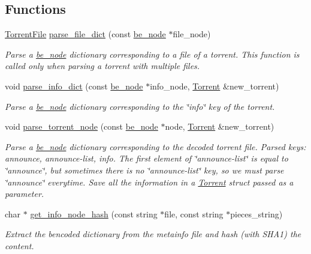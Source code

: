 \subsection*{Functions}
\begin{DoxyCompactItemize}
\item 
\hyperlink{structtorr_1_1TorrentFile}{Torrent\+File} \hyperlink{namespacetorr_a7e45f5777369e0882a30859e1bc511fa}{parse\+\_\+file\+\_\+dict} (const \hyperlink{structbe__node}{be\+\_\+node} $\ast$file\+\_\+node)
\begin{DoxyCompactList}\small\item\em Parse a \hyperlink{structbe__node}{be\+\_\+node} dictionary corresponding to a file of a torrent. This function is called only when parsing a torrent with multiple files. \end{DoxyCompactList}\item 
void \hyperlink{namespacetorr_a606e7ff691f182e90c3eb16a4d99082d}{parse\+\_\+info\+\_\+dict} (const \hyperlink{structbe__node}{be\+\_\+node} $\ast$info\+\_\+node, \hyperlink{structtorr_1_1Torrent}{Torrent} \&new\+\_\+torrent)
\begin{DoxyCompactList}\small\item\em Parse a \hyperlink{structbe__node}{be\+\_\+node} dictionary corresponding to the \char`\"{}info\char`\"{} key of the torrent. \end{DoxyCompactList}\item 
void \hyperlink{namespacetorr_a3cdccc74839c405efdf2e5c5b5ec53f9}{parse\+\_\+torrent\+\_\+node} (const \hyperlink{structbe__node}{be\+\_\+node} $\ast$node, \hyperlink{structtorr_1_1Torrent}{Torrent} \&new\+\_\+torrent)
\begin{DoxyCompactList}\small\item\em Parse a \hyperlink{structbe__node}{be\+\_\+node} dictionary corresponding to the decoded torrent file. Parsed keys\+: announce, announce-\/list, info. The first element of \char`\"{}announce-\/list\char`\"{} is equal to \char`\"{}announce\char`\"{}, but sometimes there is no \char`\"{}announce-\/list\char`\"{} key, so we must parse \char`\"{}announce\char`\"{} everytime. Save all the information in a \hyperlink{structtorr_1_1Torrent}{Torrent} struct passed as a parameter. \end{DoxyCompactList}\item 
char $\ast$ \hyperlink{namespacetorr_ae283dfa60401ce3a0030abbc93508e88}{get\+\_\+info\+\_\+node\+\_\+hash} (const string $\ast$file, const string $\ast$pieces\+\_\+string)
\begin{DoxyCompactList}\small\item\em Extract the bencoded dictionary from the metainfo file and hash (with S\+H\+A1) the content. \end{DoxyCompactList}\item 

\end{DoxyCompactItemize}
